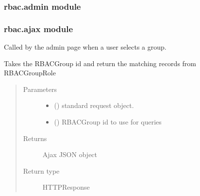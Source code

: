 \documentclass[letterpaper,10pt,english]{sphinxmanual}
\begin{document}
\subsubsection{rbac.admin module}
\label{\detokenize{rbac:module-rbac.admin}}\label{\detokenize{rbac:rbac-admin-module}}

\subsubsection{rbac.ajax module}
\label{\detokenize{rbac:module-rbac.ajax}}\label{\detokenize{rbac:rbac-ajax-module}}

\begin{fulllineitems}
\label{\detokenize{rbac:rbac.ajax.group_to_action_ajax}}
Called by the admin page when a user selects a group.

Takes the RBACGroup id and return the matching records from RBACGroupRole
\begin{quote}\begin{description}
\item[{Parameters}] \leavevmode\begin{itemize}
\item {} 
 () \textendash{} standard request object.

\item {} 
 () \textendash{} RBACGroup id to use for queries

\end{itemize}

\item[{Returns}] \leavevmode
Ajax JSON object

\item[{Return type}] \leavevmode
HTTPResponse

\end{description}\end{quote}

\end{fulllineitems}
\end{document}
